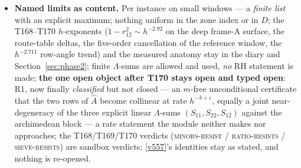 \documentclass[11pt,a4paper]{article}
\begin{document}
\begin{itemize}[leftmargin=1.5em]
$1-r_{12}^2=\det\hat A/(\hat a_{11}\hat a_{22})$ is an identity ($0.0$) --- a bound on
$\det\hat A$ \emph{is} a bound on the target with no positivity of $A_h$, no Rayleigh
detour, no R4: the Weil fence is never approached; the T169-TH9 chain
$[\max(\hat a_{11},\hat a_{22})+|\hat a_{12}|]\,\nu_2/(\hat a_{11}\hat a_{22})$ is a
valid upper bound on $12/12$ with loss exactly the Gershgorin loss; the $L_P$ no-go:
$\hat a_{12}=1.1\times10^{-17}$ identically and $1-r_{12}^2=1$ with no decay at
$m=64/128/256$; the scramble discriminator: uniform random atom positions at the
\emph{same} masses leave the rank-3 collapse \emph{untouched}
($\sigma_4/\sigma_1\le2.1\times10^{-16}$ on all $60$ draws --- it is algebra, blind to
where the atoms sit) while the value of $1-r_{12}^2$ moves by a median factor $834.8$
(range $69$--$1.8\times10^{4}$): the arithmetic content sits \emph{entirely} in the
joint values of $(S_{11},S_{22},S_{12})$ against $B$ --- which is exactly why no
size-bounding tool reaches R1. Plus exact Dirichlet/parity controls
($1.2\times10^{-14}$ / $1.4\times10^{-14}$ / zero tolerance).
\item \textbf{Named limits as content.} Per instance on small windows --- a \emph{finite
list} with an explicit maximum; nothing uniform in the zone index or in $D$; the
T168--T170 $h$-exponents ($1-r_{12}^2\sim h^{-2.92}$ on the deep frame-A surface, the
route-table deltas, the five-order cancellation of the reference window, the
$h^{-2.711}$ row-angle trend) and the measured anatomy stay in the diary and
Section~\ref{sec:phase2}; finite $\Lambda$-sums are allowed and used, \emph{no} RH
statement is made; \textbf{the one open object after T170 stays open and typed open}:
R1, now finally \emph{classified} but not closed --- an $m$-free unconditional
certificate that the two rows of $\hat A$ become collinear at rate
$h^{-3+\varepsilon}$, equally a joint near-degeneracy of the three explicit linear
$\Lambda$-sums $(S_{11},S_{22},S_{12})$ against the archimedean block --- a rate
statement the module neither makes nor approaches; the T168/T169/T170 verdicts
(\textsc{minors-resist} / \textsc{ratio-resists} / \textsc{sieve-resists}) are sandbox
verdicts; \vref{v557}'s identities stay as stated, and nothing is re-opened.
\end{itemize}
\end{document}
